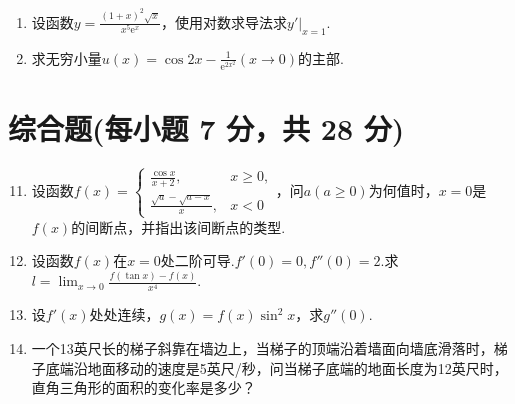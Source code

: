 \documentclass[../main.tex]{subfiles}
\begin{document}
\begin{enumerate}
          （1）$y=f(x^{2})$；

          （2）$y=(f(x))^{2}$.
          \vspace{9em}

    \item 设函数$y=\frac{(1+x)^{2}\sqrt{x}}{x^{5}\mathrm{e}^{x}}$，使用对数求导法求$\left
              .y'\right|_{x=1}$.
          \vspace{11em}

    \item 求无穷小量$u(x)=\cos 2x-\frac{1}{\mathrm{e}^{2x^2}}(x\to0)$的主部.
          \vspace{11em}
\end{enumerate}

\section{综合题(每小题 7 分，共 28 分)}
\begin{enumerate}
    \setcounter{enumi}{10}
    \item 设函数$f(x)=
              \begin{cases}
                  \frac{\cos x}{x+2},            & x\geq0, \\
                  \frac{\sqrt{a}-\sqrt{a-x}}{x}, & x<0
              \end{cases}$，问$a(a\geq0)$为何值时，$x=0$是$f(x)$的间断点，并指出该间断点的类型.
          \vspace{12em}

    \item 设函数$f(x)$在$x=0$处二阶可导.$f'(0)=0,f''(0)=2$.求$l=\lim_{x\to0}
              \frac{f(\tan x)-f(x)}{x^{4}}$.
          \vspace{12em}

    \item 设$f'(x)$处处连续，$g(x)=f(x)\sin^{2} x$，求$g''(0)$.
          \vspace{12em}

    \item 一个13英尺长的梯子斜靠在墙边上，当梯子的顶端沿着墙面向墙底滑落时，梯子底端沿地面移动的速度是5英尺/秒，问当梯子底端的地面长度为12英尺时，直角三角形的面积的变化率是多少？
          \vspace{11em}
\end{enumerate}
\end{document}
